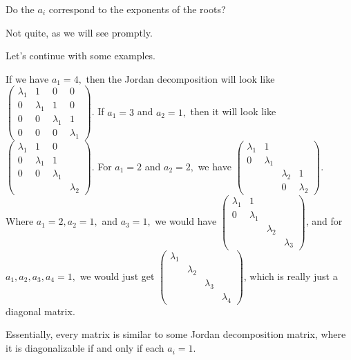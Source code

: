 \begin{question}
Do the $a_i$ correspond to the exponents of the roots?
\end{question}
\begin{ans}
Not quite, as we will see promptly.
\end{ans}

Let's continue with some examples.
\begin{example}[$n = 4$]
If we have $a_1 = 4,$ then the Jordan decomposition will look like 
$ \begin{pmatrix}
\lambda_1 & 1 & 0 & 0 \\
0 & \lambda_1 & 1 & 0 \\
0 & 0 & \lambda_1 & 1 \\
0 & 0 & 0 & \lambda_1
\end{pmatrix}$. If $a_1 = 3$ and $a_2 = 1,$ then it will look like $ \begin{pmatrix}
\lambda_1 & 1 & 0 &  \\
0 & \lambda_1 & 1 &  \\
0 & 0 & \lambda_1 &  \\
 &  &  & \lambda_2
\end{pmatrix}$.  For $a_1 = 2$ and $a_2 = 2,$ we have $\begin{pmatrix}
\lambda_1 & 1 &  &  \\
0 & \lambda_1 &  &  \\
 &  & \lambda_2 &  1\\
 &  & 0 & \lambda_2
\end{pmatrix}$. Where $a_1 = 2, a_2 = 1,$ and $a_3 = 1,$ we would have $\begin{pmatrix}
\lambda_1 & 1 &  &  \\
0 & \lambda_1 &  &  \\
 &  & \lambda_2 &  \\
 &  &  & \lambda_3
\end{pmatrix}$, and for $a_1, a_2, a_3, a_4 = 1,$ we would just get $\begin{pmatrix}
\lambda_1 &  &  &  \\
& \lambda_2 &  &  \\
 &  & \lambda_3&  \\
 &  &  & \lambda_4
\end{pmatrix}$, which is really just a diagonal matrix.
\end{example}

Essentially, every matrix is similar to some Jordan decomposition matrix, where it is diagonalizable if and only if each $a_i = 1.$ 

